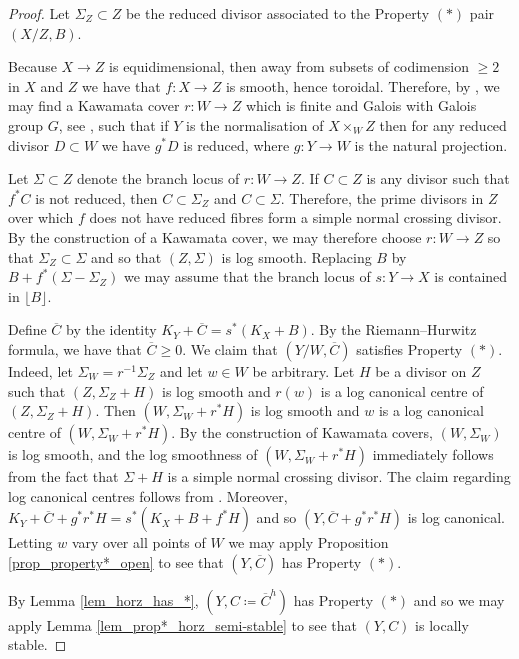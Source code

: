 \documentclass[12pt]{amsart}
\theoremstyle{plain}
\theoremstyle{definition}
\def\rar{\rightarrow}
\begin{document}
\begin{proof}
Let $\Sigma_Z \subset Z$ be the reduced divisor associated to the Property $(*)$ pair $(X/Z, B)$.

Because $X \rightarrow Z$ is equidimensional, then away from subsets of codimension $\geq 2$ in $X$ and $Z$ we have
that $f\colon X \rightarrow Z$ is smooth, hence toroidal.
Therefore, by \cite[Proposition 5.1]{AK00}, we may find a 
Kawamata cover $r\colon W\rightarrow Z$ 
which is finite and Galois with Galois group $G$, see \cite[Theorem 1-1-1]{KMM87},
such that if $Y$ is the normalisation of $X\times_WZ$ then for any reduced divisor $D \subset W$ we have
$g^*D$ is reduced, where $g\colon Y \rightarrow W$ is the natural projection.

Let $\Sigma \subset Z$ denote the branch locus of $r \colon W \rar Z$.
If $C \subset Z$ is any divisor such that $f^*C$ is not reduced, then $C \subset \Sigma_Z$ and $C\subset \Sigma$.
Therefore, the prime divisors in $Z$ over which $f$ does not have 
reduced fibres form a simple normal crossing divisor.
By the construction of a Kawamata cover,
we may therefore choose $r\colon W \rightarrow Z$ so that
$\Sigma_Z \subset \Sigma$ and so that $(Z, \Sigma)$ is log smooth.
Replacing $B$ by $B+f^*(\Sigma-\Sigma_Z)$
we may assume that the branch locus of $s\colon Y \rightarrow X$ is contained in $\lfloor B \rfloor$.

Define $\overline{C}$ by the identity $K_Y+\overline{C} = s^*(K_X+B)$.
By the Riemann--Hurwitz formula, we have that $\overline{C} \geq 0$.
We claim that $(Y/W, \overline{C})$ satisfies Property $(*)$.
Indeed, let $\Sigma_W = r^{-1}\Sigma_Z$ and let $w \in W$ be arbitrary.
Let $H$ be a divisor on $Z$ such that $(Z, \Sigma_Z+H)$ is log smooth and 
$r(w)$ is a log canonical centre of $(Z, \Sigma_Z+H)$.
Then $(W, \Sigma_W+r^*H)$ is log smooth and $w$ is a log canonical centre of 
$(W, \Sigma_W+r^*H)$.
By the construction of Kawamata covers, $(W,\Sigma_W)$ is log smooth, 
and the log smoothness of $(W,\Sigma_W+r^*H)$ immediately follows from 
the fact that $\Sigma+H$ is a simple normal crossing divisor.
The claim regarding log canonical centres follows from \cite[Proposition 5.20]{KM98}.
Moreover, $K_Y+\overline{C}+g^*r^*H = s^*(K_X+B+f^*H)$ and so $(Y, \overline{C}+g^*r^*H)$ is log canonical.
Letting $w$ vary over all points of $W$ we may apply 
Proposition \ref{prop_property*_open} to see that $(Y, \overline{C})$ has Property $(*)$. 

By Lemma \ref{lem_horz_has_*}, $(Y, C\coloneqq \overline{C}^h)$ has Property $(*)$ and so
we may apply Lemma \ref{lem_prop*_horz_semi-stable} to see that $(Y, C)$ is locally stable.


\end{proof}
\end{document}
